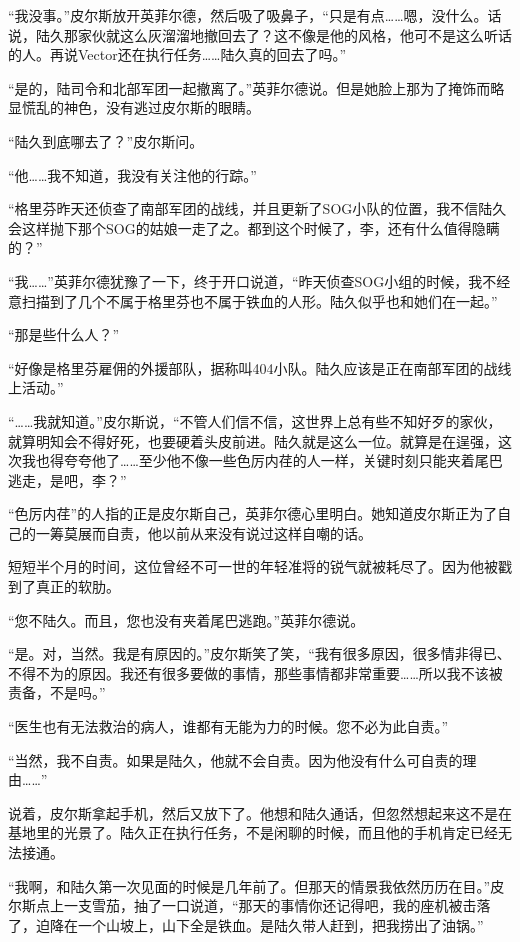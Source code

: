 “我没事。”皮尔斯放开英菲尔德，然后吸了吸鼻子，“只是有点……嗯，没什么。话说，陆久那家伙就这么灰溜溜地撤回去了？这不像是他的风格，他可不是这么听话的人。再说Vector还在执行任务……陆久真的回去了吗。”

“是的，陆司令和北部军团一起撤离了。”英菲尔德说。但是她脸上那为了掩饰而略显慌乱的神色，没有逃过皮尔斯的眼睛。

“陆久到底哪去了？”皮尔斯问。

“他……我不知道，我没有关注他的行踪。”

“格里芬昨天还侦查了南部军团的战线，并且更新了SOG小队的位置，我不信陆久会这样抛下那个SOG的姑娘一走了之。都到这个时候了，李，还有什么值得隐瞒的？”

“我……”英菲尔德犹豫了一下，终于开口说道，“昨天侦查SOG小组的时候，我不经意扫描到了几个不属于格里芬也不属于铁血的人形。陆久似乎也和她们在一起。”

“那是些什么人？”

“好像是格里芬雇佣的外援部队，据称叫404小队。陆久应该是正在南部军团的战线上活动。”

“……我就知道。”皮尔斯说，“不管人们信不信，这世界上总有些不知好歹的家伙，就算明知会不得好死，也要硬着头皮前进。陆久就是这么一位。就算是在逞强，这次我也得夸夸他了……至少他不像一些色厉内荏的人一样，关键时刻只能夹着尾巴逃走，是吧，李？”

“色厉内荏”的人指的正是皮尔斯自己，英菲尔德心里明白。她知道皮尔斯正为了自己的一筹莫展而自责，他以前从来没有说过这样自嘲的话。

短短半个月的时间，这位曾经不可一世的年轻准将的锐气就被耗尽了。因为他被戳到了真正的软肋。

“您不陆久。而且，您也没有夹着尾巴逃跑。”英菲尔德说。

“是。对，当然。我是有原因的。”皮尔斯笑了笑，“我有很多原因，很多情非得已、不得不为的原因。我还有很多要做的事情，那些事情都非常重要……所以我不该被责备，不是吗。”

“医生也有无法救治的病人，谁都有无能为力的时候。您不必为此自责。”

“当然，我不自责。如果是陆久，他就不会自责。因为他没有什么可自责的理由……”

说着，皮尔斯拿起手机，然后又放下了。他想和陆久通话，但忽然想起来这不是在基地里的光景了。陆久正在执行任务，不是闲聊的时候，而且他的手机肯定已经无法接通。

“我啊，和陆久第一次见面的时候是几年前了。但那天的情景我依然历历在目。”皮尔斯点上一支雪茄，抽了一口说道，“那天的事情你还记得吧，我的座机被击落了，迫降在一个山坡上，山下全是铁血。是陆久带人赶到，把我捞出了油锅。”


